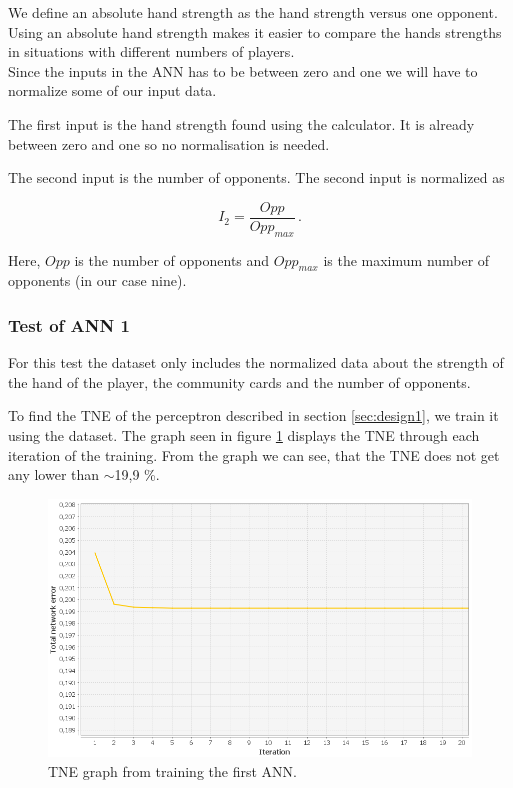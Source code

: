 We define an absolute hand strength as the hand strength versus one opponent. Using an absolute hand strength makes it easier to compare the hands strengths in situations with different numbers of players. \\

Since the inputs in the ANN has to be between zero and one we will have to normalize some of our input data.

The first input is the hand strength found using the calculator. It is already between zero and one so no normalisation is needed. 

The second input is the number of opponents. The second input is normalized as 

\[I_{2} = \frac{Opp}{Opp_{max}}\,.\]

Here, $Opp$ is the number of opponents and $Opp_{max}$ is the maximum number of opponents (in our case nine).



\subsubsection{Test of ANN 1}
\label{sec:ann-test1}
For this test the dataset only includes the normalized data about the strength of the hand of the player, the community cards and the number of opponents.

To find the TNE of the perceptron described in section \ref{sec:design1}, we train it using the dataset. The graph seen in figure \ref{fig:tneg1} displays the TNE through each iteration of the training. From the graph we can see, that the TNE does not get any lower than $\sim$19,9 \%.

\begin{figure}[H]
  \center
    \includegraphics[scale=0.6]{images/nn/default-nn1-err.png}
  \caption{TNE graph from training the first ANN.\label{fig:tneg1}}
\end{figure}


